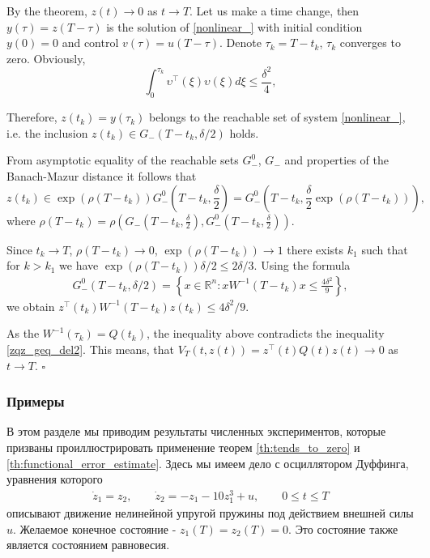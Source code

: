 \documentclass[../main.tex]{subfiles}
\begin{document}
    By the theorem, $z(t) \to 0 $ as $t \to T$. Let us make a time change, then $y(\tau)=z(T-\tau)$ is the solution of \eqref{nonlinear_} with initial condition $y(0)=0$ and control $ v(\tau)=u(T-\tau)$. Denote $\tau_k = T - t_k$, $\tau_k $ converges to zero. Obviously, 
    $$\int_{0}^{\tau_k} \upsilon^{\top}(\xi)\upsilon(\xi) 
	d\xi \leqslant \frac{\delta^2}{4}, $$
    
      Therefore, $z(t_k) = y(\tau_k) $ belongs to the reachable set of system \eqref{nonlinear_}, i.e. the inclusion $z(t_k) \in G_{-}(T-t_k,\delta/2)$ holds.
 
 
    From asymptotic equality of the reachable sets $G_{-}^0$, $ G_{-}$ \cite{GusOsSteklov} and properties of the  Banach-Mazur distance it  follows  that $$z(t_k) \in \exp(\rho(T-t_k))G_{-}^0(T-t_k,\frac{\delta}{2})=G_{-}^0(T-t_k,\frac{\delta}{2}\exp(\rho(T-t_k)))  , $$ where $\rho(T-t_k)=\rho(G_{-}(T-t_k,\frac{\delta}{2}),G_{-}^0(T-t_k,\frac{\delta}{2}))$.

 Since $t_k \to T$, $\rho(T-t_k) \to 0$, $\exp(\rho(T-t_k)) \to 1$ there exists $k_1$  such that for $k > k_1$ we have $\exp(\rho(T-t_k))\delta/2 \leqslant 2\delta/3$. 
Using the formula
\begin{gather*}
G_{-}^0(T-t_k, \delta/2)=\left\{x \in \mathbb{R}^n: x W^{-1}(T-t_k) x \leqslant \frac{4\delta^2}{9} \right\},	
\end{gather*}
we obtain $ z^{\top}(t_k) W^{-1}(T-t_k) z(t_k) \leqslant 4\delta^2/9$.

 As the $ W^{-1}(\tau_k) = Q(t_k)$, the inequality above contradicts the inequality \eqref{zqz_geq_del2}. This means, that $V_{T}(t,z(t))  =z^{\top}(t)Q(t)z(t) \to 0$  as $t \to T$.
	\hfill $ \square $

\subsubsection{Примеры}


В этом разделе мы приводим результаты численных экспериментов, которые призваны проиллюстрировать применение теорем \ref{th:tends_to_zero} и \ref{th:functional_error_estimate}. 
Здесь мы имеем дело с осциллятором Дуффинга, уравнения которого
\begin{gather}\label{Duffing}
    \dot{z}_1 = z_2, \qquad \dot{z}_2 = -z_1 - 10z_1^3 + u,\qquad 0\leqslant t 
    \leqslant T
\end{gather}
описывают движение нелинейной упругой пружины под действием внешней силы $u$. Желаемое конечное состояние - $z_1(T) = z_2(T) = 0$. 
Это состояние также является состоянием равновесия. 
\end{document}
